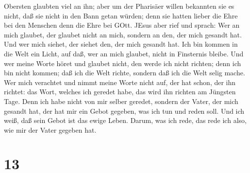 Obersten glaubten viel an ihn; aber um der Pharisäer willen bekannten
sie es nicht, daß sie nicht in den Bann getan würden;  denn
sie hatten lieber die Ehre bei den Menschen denn die Ehre bei GOtt.
 JEsus aber rief und sprach: Wer an mich glaubet, der
glaubet nicht an mich, sondern an den, der mich gesandt hat.
 Und wer mich siehet, der siehet den, der mich gesandt hat.
 Ich bin kommen in die Welt ein Licht, auf daß, wer an mich
glaubet, nicht in Finsternis bleibe.  Und wer meine Worte
höret und glaubet nicht, den werde ich nicht richten; denn ich bin nicht
kommen; daß ich die Welt richte, sondern daß ich die Welt selig mache.
 Wer mich verachtet und nimmt meine Worte nicht auf, der
hat schon, der ihn richtet: das Wort, welches ich geredet habe, das wird
ihn richten am Jüngsten Tage.  Denn ich habe nicht von mir
selber geredet, sondern der Vater, der mich gesandt hat, der hat mir ein
Gebot gegeben, was ich tun und reden soll.  Und ich weiß,
daß sein Gebot ist das ewige Leben. Darum, was ich rede, das rede ich
also, wie mir der Vater gegeben hat.

\hypertarget{section-12}{%
\section{13}\label{section-12}}

